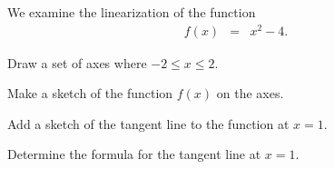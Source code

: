 \begin{problem} 
\item We examine the linearization of the function
  \begin{eqnarray*}
    f(x) & = & x^2-4.
  \end{eqnarray*}
  \begin{subproblem}
  \item Draw a set of axes where $-2\leq x \leq 2$. 


    \vfill

  \item Make a sketch of the function $f(x)$ on the axes.
  \item Add a sketch of the tangent line to the function at $x=1$.
  \item Determine the formula for the tangent line at $x=1$.
    \vfill

  \end{subproblem}
\end{problem}


